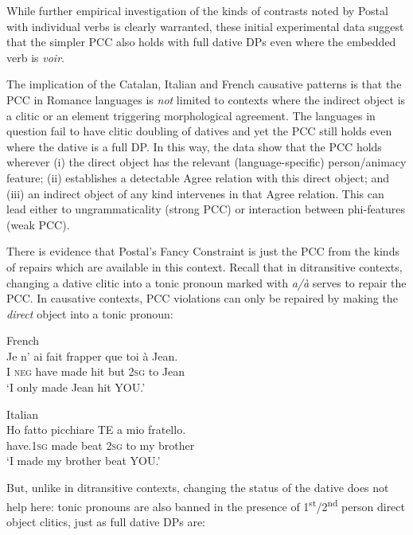 \documentclass[output=paper,colorlinks,citecolor=brown,nonflat]{langsci/langscibook}
\begin{document}
While further empirical investigation of the kinds of contrasts noted by Postal with individual verbs is clearly warranted, these initial experimental data suggest that the simpler PCC also holds with full dative DPs even where the embedded verb is \textit{voir}.

The implication of the Catalan, Italian and French causative patterns is that the PCC in Romance languages is \textit{not} limited to contexts where the indirect object is a clitic or an element triggering morphological agreement. The languages in question fail to have clitic doubling of datives and yet the PCC still holds even where the dative is a full DP. In this way, the data show that the PCC holds wherever (i) the direct object has the relevant (language-specific) person/animacy feature; (ii) {\liv} establishes a detectable Agree relation with this direct object; and (iii) an indirect object of any kind intervenes in that Agree relation. This can lead either to ungrammaticality (strong PCC) or interaction between phi-features (weak PCC).

There is evidence that Postal’s Fancy Constraint is just the PCC from the kinds of repairs which are available in this context. Recall that in ditransitive contexts, changing a dative clitic into a tonic pronoun marked with \textit{a/à} serves to repair the PCC. In causative contexts, PCC violations can only be repaired by making the \textit{direct} object into a tonic pronoun:

\ea%
    \label{ex:sheehan:26}
    French\\
    \gll    Je   n’  ai   fait   frapper   que   toi   à   Jean.\\
            I   \textsc{neg}   have   made   hit   but   2\textsc{sg}   to   Jean\\
    \glt    ‘I only made Jean hit YOU.’
\z

\ea%
    \label{ex:sheehan:27}
    Italian\\
    \gll    Ho       fatto   picchiare   TE  a  mio  fratello.\\
            have.\textsc{1sg}   made   beat  2\textsc{sg}   to  my  brother\\
    \glt    ‘I made my brother beat YOU.’
\z

But, unlike in ditransitive contexts, changing the status of the dative does not help here: tonic pronouns are also banned in the presence of 1\textsuperscript{st}/2\textsuperscript{nd} person direct object clitics, just as full dative DPs are:
\end{document}
